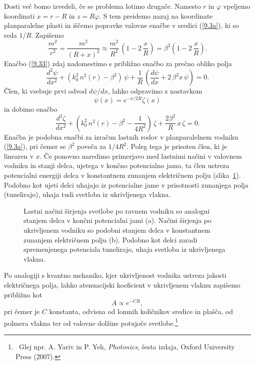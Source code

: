Dosti več bomo izvedeli, če se problema lotimo drugače. Namesto $r$
in $\varphi$ vpeljemo koordinati $x=r-R$ in $z=R\varphi$.
S tem preidemo nazaj na koordinate planparalelne plasti in iščemo popravke valovne
enačbe v sredici (\ref{9.3a}), ki so reda $1/R.$ Zapišemo
\begin{equation}
\frac{m^{2}}{r^{2}}=\frac{m^{2}}{\left(R+x\right)^{2}}\approx\frac{m^{2}}
{R^{2}}\,\left(1-2\,\frac{x}{R}\right)=\beta^{2}\left(1-2\,\frac{x}{R}\right)\!.
\label{9.34}
\end{equation}
Enačbo (\ref{9.33}) zdaj nadomestimo s približno enačbo za prečno obliko
polja 
\begin{equation}
\frac{d^{2}\psi}{dx^{2}}+\left(k_{0}^{2}\, n^{2}\left(r\right)-\beta^{2}\right)\,\psi+\frac{1}{R}\,
\left(\frac{d\psi}{dx}+2\,\beta^{2}x\,\psi\right)=0.
\label{9.35}
\end{equation}
Člen, ki vsebuje prvi odvod $d \psi/d x$, lahko odpravimo z nastavkom 
\begin{equation}
\psi(x) = e^{-x/2R} \zeta(x)
\end{equation}
in dobimo enačbo
\begin{equation}
\frac{d^{2}\zeta}{dx^{2}}+\left(k_{0}^{2}\, n^{2}\left(r\right)-\beta^{2}-\frac{1}{4R^2}\right)\,\zeta
+ \frac{2\beta^{2}}{R}\,x\,\zeta=0.
\label{9.35a}
\end{equation}
Enačba je podobna enačbi za izračun lastnih rodov v planparalelnem
vodniku (\ref{9.3a}), pri čemer se $\beta^2$ poveča za $1/4R^2$. Poleg tega je prisoten
člen, ki je linearen v $x$. Če ponovno naredimo primerjavo
med lastnimi načini v valovnem vodniku in stanji delca, ujetega v končno potencialno jamo, 
ta člen ustreza potencialni energiji delca v konstantnem zunanjem električnem 
polju (slika~\ref{fig:tunel}). Podobno kot ujeti delci uhajajo iz potencialne jame
v prisotnosti zunanjega polja (tunelirajo), uhaja tudi svetloba iz ukrivljenega vlakna.
\begin{figure}[ht]
\centering
\def\svgwidth{100truemm} 
 
\caption{Lastni načini širjenja svetlobe po ravnem vodniku so analogni stanjem 
delca v končni potencialni jami (a). Načini širjenja po ukrivljenem vodniku
so podobni stanjem delca v konstantnem zunanjem električnem polju (b). Podobno
kot delci zaradi spremenjenega potenciala tunelirajo, uhaja svetloba iz ukrivljenega vlakna.}
\label{fig:tunel}
\end{figure}

Po analogiji s kvantno mehaniko, kjer ukrivljenost vodnika ustreza jakosti električnega polja,
lahko atenuacijski koeficient v ukrivljenem vlaknu zapišemo približno kot
\begin{equation}
A \propto e^{-CR},
\end{equation}
pri čemer je $C$ konstanta, odvisna od lomnih količnikov sredice in plašča, od polmera vlakna 
ter od valovne dolžine potujoče svetlobe.\footnote{~Glej npr. A. Yariv in 
P. Yeh, {\it Photonics}, šesta izdaja, Oxford
University Press (2007).} 


